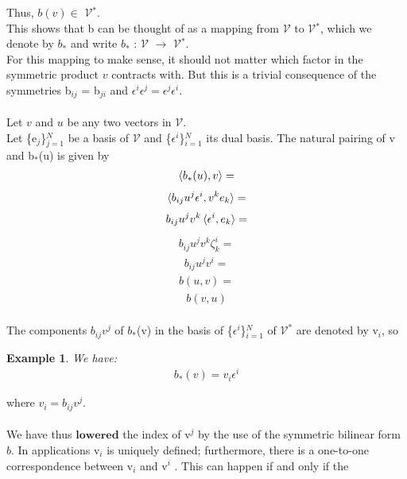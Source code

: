 \documentclass[12pt,a4paper]{article}
\newtheorem{exmp}{Example}[section]
\begin{document}
Thus, $b(v)$$\in$ $\mathcal{V}$$^*$. \\This shows that b can be thought of as a mapping from
$\mathcal{V}$ to $\mathcal{V}$$^*$, which we denote by $b_*$ and write $b_*$ : $\mathcal{V}$ $\to$ $\mathcal{V}$$^*$. 
\\For this mapping
to make sense, it should not matter which factor in the symmetric product $v$
contracts with. But this is a trivial consequence of the symmetries b$_{ij}$ = b$_{ji}$
and $\epsilon^i \epsilon^j = \epsilon^j \epsilon^i.$\\
\\Let $v$ and $u$ be any two vectors in $\mathcal{V}$. \\Let  \{e$_j$\}$^N_{j=1}$ be a basis of $\mathcal{V}$ and \{$\epsilon^i$\}$^N_{i=1}$ its dual basis. The natural pairing of v and b$_*$(u) is given by
\begin{align*}
\braket{b_*(u), v} = 
\end{align*}
\begin{align*}
\braket{b_{ij} u^j \epsilon^i, v^k e_k} =
\end{align*}
\begin{align*}
b_{ij}u^j v^k \braket{\epsilon^i, e_k}=
\end{align*}
\begin{align*}
b_{ij}u^j v^k \zeta^i_k=
\end{align*}
\begin{align*}
b_{ij}u^j v^i=
\end{align*}
\begin{align*}
b(u,v)=
\end{align*}
\begin{align*}
b(v,u)
\end{align*}
\\
The components $b_{ij}v^{j}$ of $b_*$(v) in the basis of \{$\epsilon^i$\}$^N_{i=1}$ of $\mathcal{V}^*$ are denoted by v$_i$, so
\begin{exmp} \label{eq1}
We have:
\begin{align*}
b_*(v) = v_i \epsilon^i
\end{align*}
\end{exmp}
where $v_i = b_{ij} v^j$.\\
\\
We have thus $\textbf{lowered}$ the index of v$^j$ by the use of the symmetric bilinear
form $b$. In applications v$_i$ is uniquely defined; furthermore, there is a one-to-one correspondence between v$_i$ and v$^i$
. This can happen if and only if the
\end{document}
